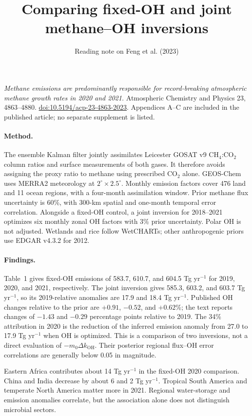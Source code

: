 \documentclass[11pt]{article}
\title{Comparing fixed-OH and joint methane--OH inversions}
\author{Reading note on Feng et al. (2023)}\date{}
\begin{document}
\maketitle
\noindent\textit{Methane emissions are predominantly responsible for
record-breaking atmospheric methane growth rates in 2020 and 2021.}
Atmospheric Chemistry and Physics 23, 4863--4880.
\href{https://doi.org/10.5194/acp-23-4863-2023}{doi:10.5194/acp-23-4863-2023}.
Appendices A--C are included in the published article; no separate
supplement is listed.

\paragraph{Method.}
The ensemble Kalman filter jointly assimilates Leicester GOSAT v9
CH$_4$:CO$_2$ column ratios and surface measurements of both gases.
It therefore avoids assigning the proxy ratio to methane using prescribed
CO$_2$ alone. GEOS-Chem uses MERRA2 meteorology at
$2^\circ\times2.5^\circ$. Monthly emission factors cover 476 land
and 11 ocean regions, with a four-month assimilation window.
Prior methane flux uncertainty is 60\%, with 300-km spatial and one-month
temporal error correlation. Alongside a fixed-OH control, a joint inversion
for 2018--2021 optimizes six monthly zonal OH factors with 3\% prior
uncertainty. Polar OH is not adjusted. Wetlands and rice follow WetCHARTs;
other anthropogenic priors use EDGAR v4.3.2 for 2012.

\paragraph{Findings.}
Table~1 gives fixed-OH emissions of 583.7, 610.7, and 604.5 Tg yr$^{-1}$
for 2019, 2020, and 2021, respectively. The joint inversion gives
585.3, 603.2, and 603.7 Tg yr$^{-1}$, so its 2019-relative anomalies
are 17.9 and 18.4 Tg yr$^{-1}$. Published OH changes relative to the
prior are $+0.91$, $-0.52$, and $+0.62$\%; the text reports changes
of $-1.43$ and $-0.29$ percentage points relative to 2019. The
34\% attribution in 2020 is the reduction of the inferred emission
anomaly from 27.0 to 17.9 Tg yr$^{-1}$ when OH is optimized. This
is a comparison of two inversions, not a direct evaluation of
$-m_0\Delta k_{\mathrm{OH}}$. Their posterior regional flux--OH
error correlations are generally below 0.05 in magnitude.

Eastern Africa contributes about 14 Tg yr$^{-1}$ in the fixed-OH
2020 comparison. China and India decrease by about 6 and 2 Tg yr$^{-1}$.
Tropical South America and temperate North America matter more in
2021. Regional water-storage and emission anomalies correlate, but
the association alone does not distinguish microbial sectors.
\end{document}
